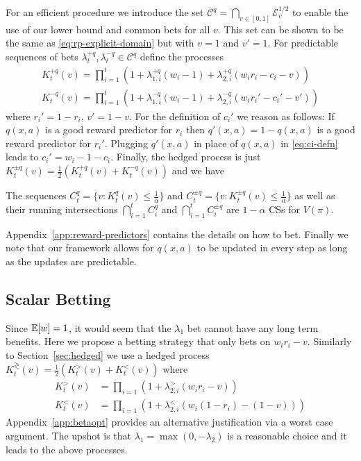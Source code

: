 For an efficient procedure we introduce the set 
$\mathcal{C}^q=\bigcap_{v \in [0,1]}\mathcal{E}_v^{1/2}$
to enable the use of our lower bound and common bets for all $v$.
This set can be shown to be the same as \eqref{eq:rp-explicit-domain}
but with $v=1$ and $v'=1$. For predictable sequences of 
bets $\lambda_{t}^{+q},\lambda_{t}^{-q}\in \mathcal{C}^q$ 
define the processes
\begin{align*}
K_t^{+q}(v) = \prod_{i=1}^{t}\left(1+\lambda_{1,i}^{+q} (w_i-1)+\lambda_{2,i}^{+q}(w_i r_i-c_i-v)\right)    \\
K_t^{-q}(v) = \prod_{i=1}^{t}\left(1+\lambda_{1,i}^{-q} (w_i-1)+\lambda_{2,i}^{-q} (w_i r_i'-c_i'-v')\right)    
\end{align*}
where $r_i'=1-r_i$, $v'=1-v$. For the definition of
$c_i'$ we reason as follows: If $q(x,a)$ is a good reward predictor
for $r_i$ then $q'(x,a)=1-q(x,a)$ is a good reward predictor for $r_i'$. 
Plugging $q'(x,a)$ in place of $q(x,a)$ in \eqref{eq:ci-defn} leads 
to $c_i' = w_i - 1 - c_i$. Finally, the hedged process is just
$
K_t^{\pm q}(v)=\frac{1}{2} (K_t^{+q}(v)+K_t^{-q}(v))
$
and we have
\begin{theorem}
\label{thm:reward-predictor}
The sequences $C_t^{q} = \{v:K_t^{q}(v)\leq \frac{1}{\alpha}\}$ and 
$C_t^{\pm q} = \{v:K_t^{\pm q}(v)\leq \frac{1}{\alpha}\}$ as well as
their running intersections $\bigcap_{i=1}^t C_i^{q}$ and
$\bigcap_{i=1}^t C_i^{\pm q}$ are $1-\alpha$ CSs for $V(\pi)$.
\end{theorem}
Appendix~\ref{app:reward-predictors} contains the details on how to bet.
Finally we note that our framework allows for $q(x,a)$ to be updated in every step as long as the updates are predictable. 

\subsection{Scalar Betting}
\label{sec:scalar}
Since $\mathbb{E}[w]=1$, it would seem that the $\lambda_1$ bet cannot have any long
term benefits. Here we propose a betting strategy that only
bets on $w_i r_i -v$.  Similarly to Section~\ref{sec:hedged} we use a hedged
process $K_t^{\gtrless}(v)=\frac{1}{2}\left(K_t^{>}(v)+K_t^{<}(v)\right)$ where
\begin{align*}
K_t^{>}(v)&=\prod_{i=1} \left(1+\lambda_{2,i}^{>} (w_i r_i -v)\right)\\
K_t^{<}(v)&=\prod_{i=1} \left(1+\lambda_{2,i}^{<} \left(w_i (1-r_i) -(1-v)\right)\right)
\end{align*}
Appendix~\ref{app:betaopt} provides an alternative justification via a worst
case argument.  The upshot is that $\lambda_1=\max(0,-\lambda_2)$ is a
reasonable choice and it leads to the above processes.

